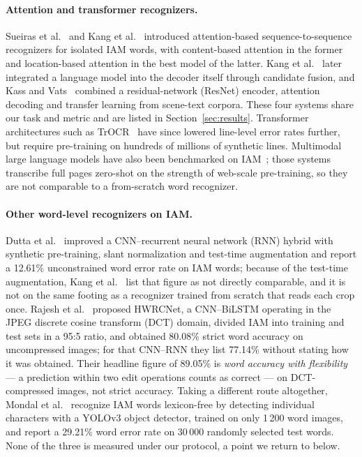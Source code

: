 \documentclass{ws-ijprai}
\begin{document}
\paragraph{Attention and transformer recognizers.}
Sueiras et al.~\cite{sueiras2018offline} and Kang et
al.~\cite{kang2018convolve} introduced attention-based
sequence-to-sequence recognizers for isolated IAM words, with content-based
attention in the former and location-based attention in the best model of
the latter.
Kang et al.~\cite{kang2021candidate} later integrated a language model
into the decoder itself through candidate fusion, and Kass and
Vats~\cite{kass2022attentionhtr} combined a residual-network (ResNet)
encoder, attention decoding and transfer learning from scene-text
corpora. These four systems share our task and metric and are listed in
Section~\ref{sec:results}. Transformer
architectures such as TrOCR~\cite{li2023trocr} have since lowered
line-level error rates further, but require pre-training on hundreds
of millions of synthetic lines. Multimodal large language models have
also been benchmarked on IAM~\cite{crosilla2025llmhtr}; those systems
transcribe full pages zero-shot on the strength of web-scale
pre-training, so they are not comparable to a from-scratch word
recognizer.

\paragraph{Other word-level recognizers on IAM.}
Dutta et al.~\cite{dutta2018improving} improved a CNN--recurrent
neural network (RNN) hybrid with synthetic pre-training, slant
normalization and test-time augmentation and report a 12.61\%
unconstrained word error rate on IAM words; because of the test-time
augmentation, Kang et al.~\cite{kang2021candidate} list that figure as not
directly comparable, and it is not on the same footing as a recognizer
trained from scratch that reads each crop once. Rajesh et
al.~\cite{rajesh2022hwrcnet} proposed HWRCNet, a CNN--BiLSTM operating in
the JPEG discrete cosine transform (DCT) domain, divided IAM into training
and test sets in a 95:5 ratio, and obtained 80.08\% strict word accuracy on
uncompressed images; for that CNN--RNN they list 77.14\% without stating how
it was obtained. Their headline figure of 89.05\% is \emph{word accuracy
with flexibility} --- a prediction within two edit operations counts as
correct --- on DCT-compressed images, not strict accuracy.
Taking a different route altogether, Mondal et
al.~\cite{mondal2022yolo} recognize IAM words lexicon-free by detecting
individual characters with a YOLOv3 object detector, trained on only
1\,200 word images, and report a 29.21\% word error rate on 30\,000
randomly selected test words. None of the three is measured under our
protocol, a point we return to below.
\end{document}
